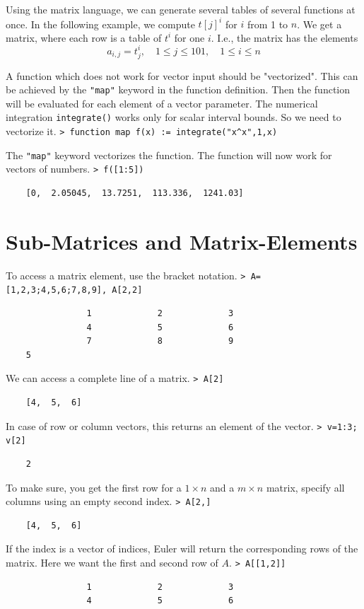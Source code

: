 \documentclass[11pt, a4paper]{article}
\newcommand{\emtcmd}[1]{\noindent\texttt{\textcolor{emtcommand}{>}\ #1}\par\smallskip}
\begin{document}
Using the matrix language, we can generate several tables of several functions at once. In the following example, we compute $t[j]^i$ for $i$ from 1 to $n$. We get a matrix, where each row is a table of $t^i$ for one $i$. I.e., the matrix has the elements
$$a_{i,j} = t_j^i, \quad 1 \le j \le 101, \quad 1 \le i \le n$$

A function which does not work for vector input should be "vectorized". This can be achieved by the \texttt{"map"} keyword in the function definition. Then the function will be evaluated for each element of a vector parameter. The numerical integration \texttt{integrate()} works only for scalar interval bounds. So we need to vectorize it.
\emtcmd{function map f(x) := integrate("x\^{}x",1,x)}

The \texttt{"map"} keyword vectorizes the function. The function will now work for vectors of numbers.
\emtcmd{f([1:5])}
\begin{verbatim}
    [0,  2.05045,  13.7251,  113.336,  1241.03]
\end{verbatim}

\section*{Sub-Matrices and Matrix-Elements}

To access a matrix element, use the bracket notation.
\emtcmd{A=[1,2,3;4,5,6;7,8,9], A[2,2]}
\begin{verbatim}
                1             2             3
                4             5             6
                7             8             9
    5
\end{verbatim}

We can access a complete line of a matrix.
\emtcmd{A[2]}
\begin{verbatim}
    [4,  5,  6]
\end{verbatim}

In case of row or column vectors, this returns an element of the vector.
\emtcmd{v=1:3; v[2]}
\begin{verbatim}
    2
\end{verbatim}

To make sure, you get the first row for a $1 \times n$ and a $m \times n$ matrix, specify all columns using an empty second index.
\emtcmd{A[2,]}
\begin{verbatim}
    [4,  5,  6]
\end{verbatim}

If the index is a vector of indices, Euler will return the corresponding rows of the matrix. Here we want the first and second row of $A$.
\emtcmd{A[[1,2]]}
\begin{verbatim}
                1             2             3
                4             5             6
\end{verbatim}
\end{document}
